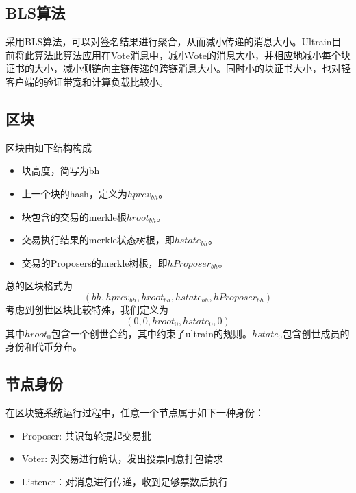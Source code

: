 \documentclass[12pt, UTF8]{article}
\begin{document}
\subsection{BLS算法}
采用BLS算法，可以对签名结果进行聚合\cite{boneh2003survey}，从而减小传递的消息大小。Ultrain目前将此算法此算法应用在Vote消息中，减小Vote的消息大小，并相应地减小每个块证书的大小，减小侧链向主链传递的跨链消息大小。同时小的块证书大小，也对轻客户端的验证带宽和计算负载比较小。

\subsection{区块}
区块由如下结构构成
\begin{itemize}
\item 块高度，简写为bh
\item 上一个块的hash，定义为$hprev_{bh}$。
\item 块包含的交易的merkle根$hroot_{bh}$。
\item 交易执行结果的merkle状态树根，即$hstate_{bh}$。
\item 交易的Proposers的merkle树根，即$hProposer_{bh}$。
\end{itemize}

总的区块格式为
\begin{equation}
(bh, hprev_{bh}, hroot_{bh}, hstate_{bh}, hProposer_{bh})
\end{equation}
考虑到创世区块比较特殊，我们定义为
\begin{equation}
(0,0,hroot_0, hstate_0,0)
\end{equation}
其中$hroot_0$包含一个创世合约，其中约束了ultrain的规则。$hstate_0$包含创世成员的身份和代币分布。

\subsection{节点身份}
在区块链系统运行过程中，任意一个节点属于如下一种身份：
\begin{itemize}
\item Proposer: 共识每轮提起交易批
\item Voter: 对交易进行确认，发出投票同意打包请求
\item Listener：对消息进行传递，收到足够票数后执行
\end{itemize}
\end{document}
